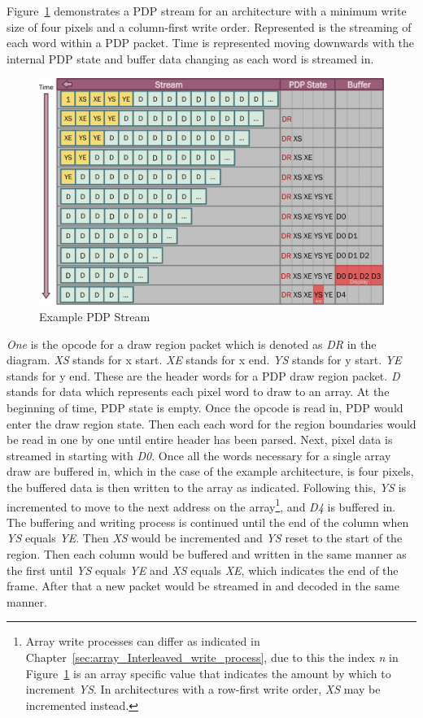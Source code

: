     Figure~\ref{fig:pdp_stream} demonstrates a PDP stream for an architecture with a minimum write size of four pixels and a column-first write order. Represented is the streaming of each word within a PDP packet. Time is represented moving downwards with the internal PDP state and buffer data changing as each word is streamed in.

    \begin{figure}
        \centering
        \includegraphics[width=1.0\textwidth]{fig/pdp_stream.pdf}
        \caption{Example PDP Stream}
        \label{fig:pdp_stream}
    \end{figure}

    {\it One} is the opcode for a draw region packet which is denoted as {\it DR} in the diagram. {\it XS} stands for x start. {\it XE} stands for x end. {\it YS} stands for y start. {\it YE} stands for y end. These are the header words for a PDP draw region packet. {\it D} stands for data which represents each pixel word to draw to an array. At the beginning of time, PDP state is empty. Once the opcode is read in, PDP would enter the draw region state. Then each each word for the region boundaries would be read in one by one until entire header has been parsed. Next, pixel data is streamed in starting with {\it D0}. Once all the words necessary for a single array draw are buffered in, which in the case of the example architecture, is four pixels, the buffered data is then written to the array as indicated. Following this, {\it YS} is incremented to move to the next address on the array\footnote{Array write processes can differ as indicated in Chapter~\ref{sec:array_Interleaved_write_process}, due to this the index {\it n} in Figure~\ref{fig:pdp_stream} is an array specific value that indicates the amount by which to increment {\it YS}. In architectures with a row-first write order, {\it XS} may be incremented instead.}, and {\it D4} is buffered in. The buffering and writing process is continued until the end of the column when {\it YS} equals {\it YE}. Then {\it XS} would be incremented and {\it YS} reset to the start of the region. Then each column would be buffered and written in the same manner as the first until {\it YS} equals {\it YE} and {\it XS} equals {\it XE}, which indicates the end of the frame. After that a new packet would be streamed in and decoded in the same manner.

